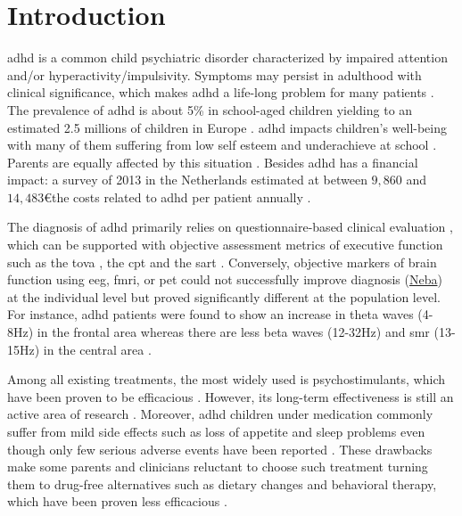 

\section{Introduction} 

\gls{adhd} is a common child psychiatric disorder characterized by impaired attention and/or hyperactivity/impulsivity.
Symptoms may persist in adulthood with clinical significance, which makes \gls{adhd} a life-long problem for many
patients \citep{Faraone2006}. The prevalence of \gls{adhd} is about 5\% in school-aged children yielding to an
estimated 2.5 millions of children in Europe \citep{DSM-5}. \gls{adhd} impacts children's well-being with 
many of them suffering from low self esteem \citep{Shaw2005} and underachieve at school \citep{Barry2002}. Parents are
equally affected by this situation \citep{Harpin2005}. Besides \gls{adhd} has a financial impact: a survey of 2013 in the
Netherlands estimated at between $9,860$ and $14,483$\euro the costs related to \gls{adhd} per patient annually
\citep{le2014}. 
 
The diagnosis of \gls{adhd} primarily relies on questionnaire-based clinical evaluation \citep{DSM-5}, which can be
supported with objective assessment metrics of executive function such as the \gls{tova} \citep{Forbes1998}, the
\gls{cpt} \citep{Barkley1991} and the \gls{sart} \citep{Robertson1997}. Conversely, objective markers of brain
function using \gls{eeg}, \gls{fmri}, or \gls{pet} could not successfully improve diagnosis 
(\href{https://shop.nebahealth.com/products/neba-fda-cleared-brainwave-adhd-assessment-aid}{Neba}) at the individual
level but proved significantly different at the population level.
 For instance, \gls{adhd} patients were found to show an increase in theta waves (4-8Hz) in the
frontal area whereas there are less beta waves (12-32Hz) and \gls{smr} (13-15Hz) in the central area
\citep{Monastra2005, Matouvsek1984, Janzen1995,loo2017}.  
 
Among all existing treatments, the most widely used is psychostimulants, which have been proven to be efficacious
\citep{Taylor2014, Storebo2015}. However, its long-term effectiveness is still an active area of research
\citep{DuPaul1998, Swanson2001, Jensen1999}. Moreover, \gls{adhd} children under medication commonly suffer from mild side
effects such as loss of appetite and sleep problems even though only few serious adverse events have been reported
\citep{Storebo2015, Cooper2011}. These drawbacks make some parents and clinicians reluctant to choose such
treatment turning them to drug-free alternatives such as dietary changes \citep{Belanger2009} and behavioral
therapy, which have been proven less efficacious \citep{Sonuga-Barke2013}.


